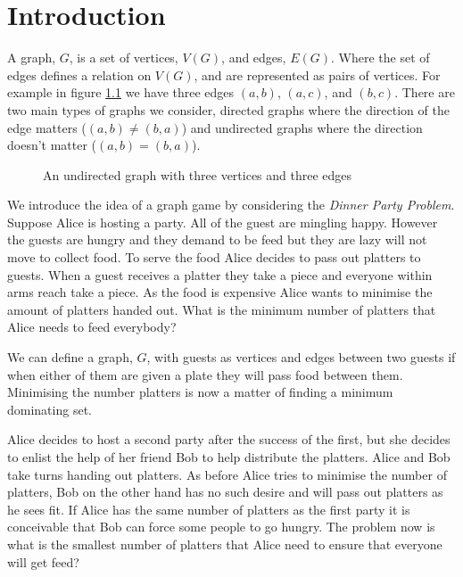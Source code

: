 \chapter{Introduction}\label{chpt:into}
A graph, $G$, is a set of vertices, $V(G)$, and edges, $E(G)$. Where the set of edges defines a relation on $V(G)$, and are represented as pairs of vertices. For example in figure \ref{fig:k3} we have three edges $(a,b)$, $(a,c)$, and $(b,c)$. There are two main types of graphs we consider, directed graphs where the direction of the edge matters ($(a,b)\neq (b,a)$) and undirected graphs where the direction doesn't matter ($(a,b)=(b,a)$).

\begin{figure}[h]
    \centering
{}
    \caption{An undirected graph with three vertices and three edges}
\label{fig:k3}
\end{figure}
   
We introduce the idea of a graph game by considering the \textit{Dinner Party Problem}.
Suppose Alice is hosting a party. All of the guest are mingling happy. However the guests are hungry and they demand to be feed but they are lazy will not move to collect food. To serve the food Alice decides to pass out platters to guests. When a guest receives a platter they take a piece and everyone within arms reach take a piece. As the food is expensive Alice wants to minimise the amount of platters handed out. What is the minimum number of platters that Alice needs to feed everybody? 

We can define a graph, $G$, with guests as vertices and edges between two guests if when either of them are given a plate they will pass food between them. Minimising the number platters is now a matter of finding a minimum dominating set.

Alice decides to host a second party after the success of the first, but she decides to enlist the help of her friend Bob to help distribute the platters. Alice and Bob take turns handing out platters. As before Alice tries to minimise the number of platters, Bob on the other hand has no such desire and will pass out platters as he sees fit. If Alice has the same number of platters as the first party it is conceivable that Bob can force some people to go hungry. The problem now is what is the smallest number of platters that Alice need to ensure that everyone will get feed? 

